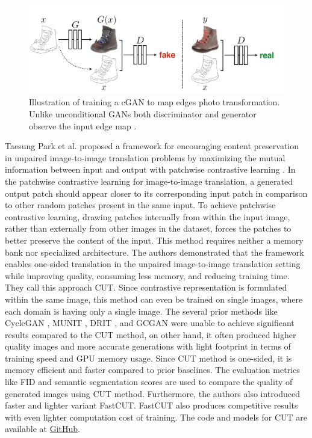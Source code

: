 \begin{figure}[H]
        \begin{center}
 	    \includegraphics[scale=0.30]{images/CGAN.png}
	    \caption[Illustration of training a \ac{cGAN} to map edges \textrightarrow photo transformation.]{Illustration of training a \ac{cGAN} to map edges \textrightarrow photo transformation. Unlike unconditional \acp{GAN} both discriminator and generator observe the input edge map \cite{isola2018imagetoimage}.}
	    \label{fig:CGAN}
	    \end{center}
\end{figure}




Taesung Park et al.\cite{park2020contrastive} proposed a framework for encouraging content preservation in unpaired image-to-image translation problems by maximizing the mutual information between input and output with patchwise contrastive learning \cite{oord2019representation}. In the patchwise contrastive learning for image-to-image translation, a generated output patch should appear closer to its corresponding input patch in comparison to other random patches present in the same input. To achieve patchwise contrastive learning, drawing patches internally from within the input image, rather than externally from other images in the dataset, forces the patches to better preserve the content of the input. This method requires neither a memory bank nor specialized architecture. The authors demonstrated that the framework enables one-sided translation in the unpaired image-to-image translation setting while improving quality, consuming less memory, and reducing training time. They call this approach \ac{CUT}. Since contrastive representation is formulated within the same image, this method can even be trained on single images, where each domain is having only a single image. The several prior methods like \ac{CycleGAN} \cite{zhu2020unpaired}, \ac{MUNIT} \cite{liu2018unsupervised}, \ac{DRIT} \cite{lee2019drit}, and \ac{GCGAN} \cite{fu2018geometryconsistent} were unable to achieve significant results compared to the \ac{CUT} method, on other hand, it often produced higher quality images and more accurate generations with light footprint in terms of training speed and GPU memory usage. Since \ac{CUT} method is one-sided, it is memory efficient and faster compared to prior baselines. The evaluation metrics like \ac{FID} \cite{heusel2018gans} and semantic segmentation scores are used to compare the quality of generated images using \ac{CUT} method. Furthermore, the authors also introduced faster and lighter variant \ac{FastCUT}. \ac{FastCUT} also produces competitive results with even lighter computation cost of training. The code and models for \ac{CUT} are available at \href{https://github.com/taesungp/contrastive-unpaired-translation}{GitHub}.


